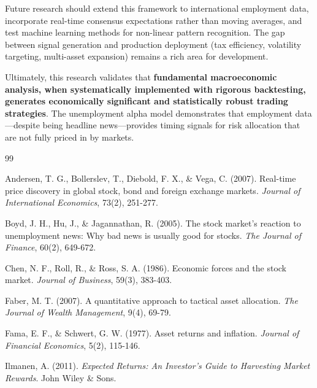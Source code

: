 \documentclass[12pt,a4paper]{article}
\begin{document}
Future research should extend this framework to international employment data, incorporate real-time consensus expectations rather than moving averages, and test machine learning methods for non-linear pattern recognition. The gap between signal generation and production deployment (tax efficiency, volatility targeting, multi-asset expansion) remains a rich area for development.

Ultimately, this research validates that \textbf{fundamental macroeconomic analysis, when systematically implemented with rigorous backtesting, generates economically significant and statistically robust trading strategies}. The unemployment alpha model demonstrates that employment data—despite being headline news—provides timing signals for risk allocation that are not fully priced in by markets.

\newpage
\begin{thebibliography}{99}

Andersen, T. G., Bollerslev, T., Diebold, F. X., \& Vega, C. (2007). Real-time price discovery in global stock, bond and foreign exchange markets. \textit{Journal of International Economics}, 73(2), 251-277.

Boyd, J. H., Hu, J., \& Jagannathan, R. (2005). The stock market's reaction to unemployment news: Why bad news is usually good for stocks. \textit{The Journal of Finance}, 60(2), 649-672.

Chen, N. F., Roll, R., \& Ross, S. A. (1986). Economic forces and the stock market. \textit{Journal of Business}, 59(3), 383-403.

Faber, M. T. (2007). A quantitative approach to tactical asset allocation. \textit{The Journal of Wealth Management}, 9(4), 69-79.

Fama, E. F., \& Schwert, G. W. (1977). Asset returns and inflation. \textit{Journal of Financial Economics}, 5(2), 115-146.

Ilmanen, A. (2011). \textit{Expected Returns: An Investor's Guide to Harvesting Market Rewards}. John Wiley \& Sons.

\end{thebibliography}

\newpage
\appendix
\end{document}
